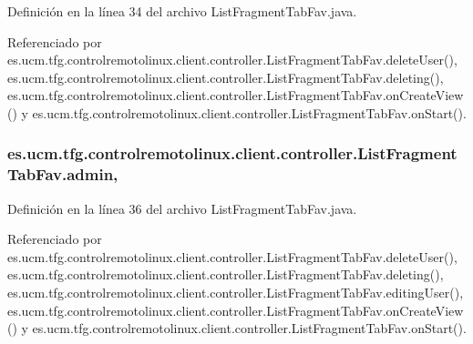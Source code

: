 Definición en la línea 34 del archivo List\-Fragment\-Tab\-Fav.\-java.



Referenciado por es.\-ucm.\-tfg.\-controlremotolinux.\-client.\-controller.\-List\-Fragment\-Tab\-Fav.\-delete\-User(), es.\-ucm.\-tfg.\-controlremotolinux.\-client.\-controller.\-List\-Fragment\-Tab\-Fav.\-deleting(), es.\-ucm.\-tfg.\-controlremotolinux.\-client.\-controller.\-List\-Fragment\-Tab\-Fav.\-on\-Create\-View() y es.\-ucm.\-tfg.\-controlremotolinux.\-client.\-controller.\-List\-Fragment\-Tab\-Fav.\-on\-Start().

\hypertarget{classes_1_1ucm_1_1tfg_1_1controlremotolinux_1_1client_1_1controller_1_1ListFragmentTabFav_abf7219fd9037bc599c963d1d8703258d}{
\subsubsection[{admin}]{ es.\-ucm.\-tfg.\-controlremotolinux.\-client.\-controller.\-List\-Fragment\-Tab\-Fav.\-admin\hspace{0.3cm}{\ttfamily [static]}, {\ttfamily [private]}}}\label{classes_1_1ucm_1_1tfg_1_1controlremotolinux_1_1client_1_1controller_1_1ListFragmentTabFav_abf7219fd9037bc599c963d1d8703258d}


Definición en la línea 36 del archivo List\-Fragment\-Tab\-Fav.\-java.



Referenciado por es.\-ucm.\-tfg.\-controlremotolinux.\-client.\-controller.\-List\-Fragment\-Tab\-Fav.\-delete\-User(), es.\-ucm.\-tfg.\-controlremotolinux.\-client.\-controller.\-List\-Fragment\-Tab\-Fav.\-deleting(), es.\-ucm.\-tfg.\-controlremotolinux.\-client.\-controller.\-List\-Fragment\-Tab\-Fav.\-editing\-User(), es.\-ucm.\-tfg.\-controlremotolinux.\-client.\-controller.\-List\-Fragment\-Tab\-Fav.\-on\-Create\-View() y es.\-ucm.\-tfg.\-controlremotolinux.\-client.\-controller.\-List\-Fragment\-Tab\-Fav.\-on\-Start().

